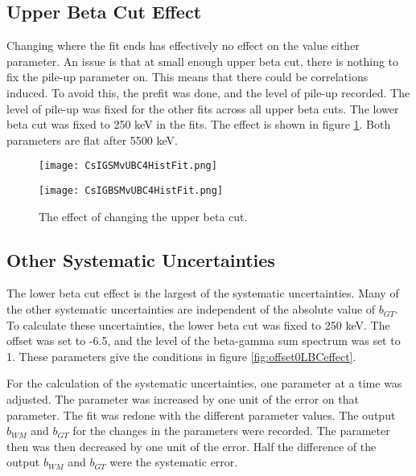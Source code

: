 \documentclass[../MaxHughesThesis.tex]{subfiles}
\begin{document}
\subsection{Upper Beta Cut Effect}

Changing where the fit ends has effectively no effect on the value either parameter.
An issue is that at small enough upper beta cut, there is nothing to fix the pile-up parameter on. 
This means that there could be correlations induced.
To avoid this, the  prefit was done, and the level of pile-up recorded.
The level of pile-up was fixed for the other fits across all upper beta cuts.
The lower beta cut was fixed to 250 keV in the fits. 
The effect is shown in figure \ref{fig:UBCEffect}.
Both parameters are flat after 5500 keV.

\begin{figure}
    \centering
    \begin{minipage}{0.50\textwidth}
        \centerline{\texttt{[image: CsIGSMvUBC4HistFit.png]}}
    \end{minipage}\hfill
    \begin{minipage}{0.50\textwidth}
        \centerline{\texttt{[image: CsIGBSMvUBC4HistFit.png]}}
    \end{minipage}
    \caption{The effect of changing the upper beta cut.}
    \label{fig:UBCEffect}
\end{figure}

\subsection{Other Systematic Uncertainties}

The lower beta cut effect is the largest of the systematic uncertainties.
Many of the other systematic uncertainties are independent of the absolute value of $b_{GT}$.
To calculate these uncertainties, the lower beta cut was fixed to 250 keV.
The offset was set to -6.5, and the level of the beta-gamma sum spectrum was set to 1.
These parameters give the conditions in figure \ref{fig:offset0LBCeffect}.

For the calculation of the systematic uncertainties, one parameter at a time was adjusted.
The parameter was increased by one unit of the error on that parameter.
The fit was redone with the different parameter values.
The output $b_{WM}$ and $b_{GT}$ for the changes in the parameters were recorded.
The parameter then was then decreased by one unit of the error.
Half the difference of the output $b_{WM}$ and $b_{GT}$ were the systematic error.
\end{document}
